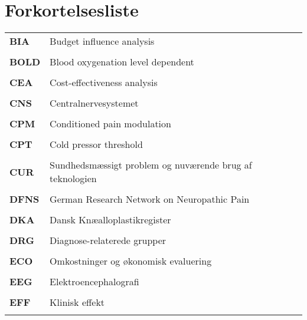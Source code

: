 \chapter*{Forkortelsesliste} \label{ordliste}
\vspace{-.75cm}
\begin{longtable}{p{}  p{}}

\textbf{BIA} & Budget influence analysis                                
\\ \\
\textbf{BOLD}& Blood oxygenation level dependent                        
\\ \\
\textbf{CEA} & Cost-effectiveness analysis  
\\ \\
\textbf{CNS} & Centralnervesystemet                             
\\ \\
\textbf{CPM} & Conditioned pain modulation                              
\\ \\
\textbf{CPT} & Cold pressor threshold                                   
\\ \\
\textbf{CUR} & Sundhedsmæssigt problem og nuværende brug af teknologien 
\\ \\
\textbf{DFNS}& German Research Network on Neuropathic Pain              
\\ \\
\textbf{DKA} & Dansk Knæalloplastikregister 
\\ \\
\textbf{DRG} & Diagnose-relaterede grupper
\\ \\
\textbf{ECO} & Omkostninger og økonomisk evaluering                     
\\ \\
\textbf{EEG} & Elektroencephalografi                                     
\\ \\
\textbf{EFF} & Klinisk effekt                                           
\\ \\

\end{longtable}
